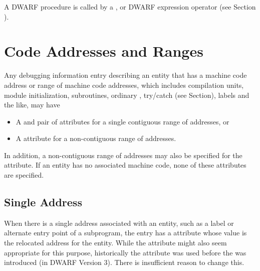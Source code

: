 A DWARF procedure
is called by a , 
 or 
DWARF expression operator 
(see Section ).

\section{Code Addresses and Ranges}
\label{chap:codeaddressesandranges}
Any debugging information entry describing an entity that has
a machine code address or range of machine code addresses,
which includes compilation units, module initialization,
subroutines, ordinary , 
try/catch  (see Section), 
labels and
the like, may have

\begin{itemize}
\item A  and  pair of 
attributes for a single contiguous range of
addresses, or

\item A  attribute for a non-contiguous range of addresses.
\end{itemize}

In addition, a non-contiguous range of 
addresses may also be specified for the
 attribute.
If an entity has no associated machine code, 
none of these attributes are specified.

\subsection{Single Address} 
When there is a single address associated with an entity,
such as a label or alternate entry point of a subprogram,
the entry has a  attribute whose value is the
relocated address for the entity.  While the 
attribute might also seem appropriate for this purpose,
historically the  attribute was used before the
 was introduced (in DWARF Version 3). There is
insufficient reason to change this.

